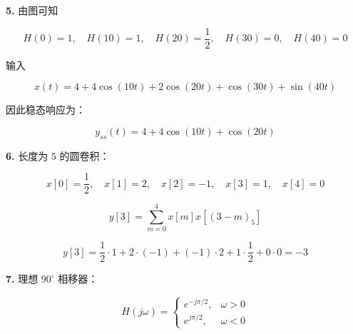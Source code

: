 \documentclass[11pt]{ctexart}
\begin{document}
\noindent\textbf{5.} 由图可知\par



\[

   H(0)=1,\quad H(10)=1,\quad H(20)=\frac12,\quad H(30)=0,\quad H(40)=0

   \]



输入\par



\[

   x(t)=4+4\cos(10t)+2\cos(20t)+\cos(30t)+\sin(40t)

   \]



因此稳态响应为：\par



\[

   y_{ss}(t)=4+4\cos(10t)+\cos(20t)

   \]



\noindent\textbf{6.} 长度为 \(5\) 的圆卷积：\par



\[

   x[0]=\frac12,\quad x[1]=2,\quad x[2]=-1,\quad x[3]=1,\quad x[4]=0

   \]



\[

   y[3]=\sum_{m=0}^{4}x[m]x[(3-m)_5]

   \]



\[

   y[3]=\frac12\cdot1+2\cdot(-1)+(-1)\cdot2+1\cdot\frac12+0\cdot0=-3

   \]



\noindent\textbf{7.} 理想 \(90^\circ\) 相移器：\par



\[

   H(j\omega)=

   \begin{cases}

   e^{-j\pi/2}, & \omega>0\\

   e^{j\pi/2}, & \omega<0

   \end{cases}

   \]
\end{document}
